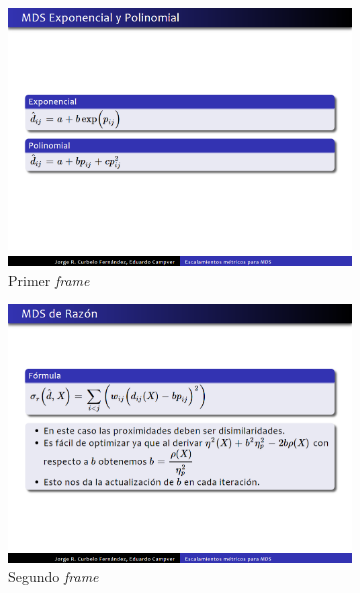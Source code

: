  		\begin{figure}[tb]
 			\centering
 			\begin{subfigure}[b]{0.3\textwidth}
 				\includegraphics[width=\textwidth]{img/f1}
 				\caption{Primer \textit{frame}}
 				\label{fig:frames_a}	
 			\end{subfigure}
 			\hspace*{\fill}
 			\begin{subfigure}[b]{0.3\textwidth}
 				\includegraphics[width=\textwidth]{img/f2}
 				\caption{Segundo \textit{frame}}
 				\label{fig:frames_b}	
 			\end{subfigure}
 			\hspace*{\fill}
 			\begin{subfigure}[b]{0.3\textwidth}

\end{subfigure}
\end{figure}
